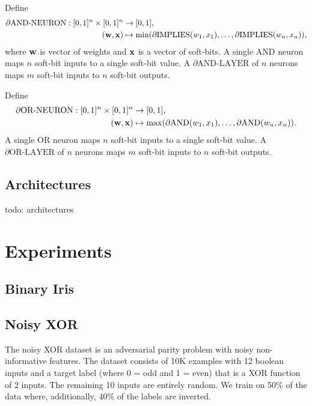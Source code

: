 \documentclass{article} %
\begin{document}

Define
\begin{equation*}
\begin{aligned}
\partial\text{AND-NEURON}: [0,1]^{n} \times [0,1]^{n} &\to [0,1], \\
({\bf w}, {\bf x}) &\mapsto \min(\partial\text{IMPLIES}(w_{1}, x_{1}), \dots, \partial\text{IMPLIES}(w_{n}, x_{n}))\text{,}
\end{aligned}
\end{equation*}
where ${\bf w}$ is vector of weights and ${\bf x}$ is a vector of soft-bits. A single AND neuron maps $n$ soft-bit inputs to a single soft-bit value. A $\partial\text{AND-LAYER}$ of $n$ neurons maps $m$ soft-bit inputs to $n$ soft-bit outputs.

Define
\begin{equation*}
\begin{aligned}
\partial\text{OR-NEURON}: [0,1]^{n} \times [0,1]^{n} &\to [0,1], \\
({\bf w}, {\bf x}) &\mapsto \max(\partial\text{AND}(w_{1}, x_{1}), \dots, \partial\text{AND}(w_{n}, x_{n}))\text{.}
\end{aligned}
\end{equation*}
A single OR neuron maps $n$ soft-bit inputs to a single soft-bit value. A $\partial\text{OR-LAYER}$ of $n$ neurons maps $m$ soft-bit inputs to $n$ soft-bit outputs.

\subsection{Architectures}

todo: architectures

\section{Experiments}

\subsection{Binary Iris}

\subsection{Noisy XOR}

The noisy XOR dataset \citep{noisy-xor-dataset} is an adversarial parity problem with noisy non-informative features. The dataset consists of 10K examples with 12 boolean inputs and a target label (where 0 = odd and 1 = even) that is a XOR function of 2 inputs. The remaining 10 inputs are entirely random. We train on 50\% of the data where, additionally, 40\% of the labels are inverted.
\end{document}
